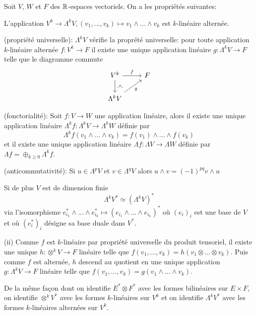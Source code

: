 \documentclass[12pt, a4paper]{book}
\begin{document}
\begin{pro}
Soit $V$, $W$ et $F$ des $\mathbb{R}$-espaces vectoriels. On a les propriétés suivantes:
\be
	\item L'application $V^k \to \Lambda^k V, (v_1, ..., v_k) \mapsto v_1 \wedge ... \wedge v_k$ est $k$-linéaire alternée.
	\item (propriété universelle): $\Lambda^k V$ vérifie la proprété universelle: pour toute application $k$-linéaire alternée $f: V^k \to F$ il existe une unique application linéaire $g : \Lambda^k V \to F$ telle que le diagramme commute
	$$\begin{tikzcd}
	V^k \arrow[r, "f"]  \arrow[d, ".\wedge ."] & F \\
	\Lambda^kV \arrow[ru, "g"']& 
	\end{tikzcd}$$
	\item (fonctorialité):  Soit $f: V \to W$ une application linéaire, alors il existe une unique application linéaire $\Lambda^k f : \Lambda^k V \to \Lambda^k W$ définie par
	$$\Lambda^k f (v_1\wedge ... \wedge v_k) = f(v_1) \wedge ... \wedge f(v_k)$$
	et il existe une unique application linéaire $\Lambda f : \Lambda V \to \Lambda W$ définie par $\Lambda f = \oplus_{k\geq 0} \Lambda^k f$. \\
	\item (anticommutativité): Si $u \in \Lambda^p V$ et $v \in \Lambda^q V$ alors $u\wedge v = (-1)^{pq} v\wedge u$
	\item Si de plus $V$ est de dimension finie
	$$\Lambda^k V^* \simeq (\Lambda^k V)^*$$ 
	via l'isomorphisme $e_{i_1}^* \wedge ...\wedge e_{i_k}^* \mapsto (e_{i_1} \wedge ... \wedge e_{i_k})^*$ où $(e_i)_i$ est une base de $V$ et où $(e_i^*)_i$ désigne sa base duale dans $V^*$.
\ee
\end{pro}
\begin{preu}
(ii) Comme $f$ est $k$-linéaire par propriété universelle du produit tensoriel, il existe une unique $h: \otimes^k V \to F$ linéaire telle que $f(v_1, ..., v_k) = h(v_1 \otimes ... \otimes v_k)$. Puis comme $f$ est alternée, $h$ descend au quotient en une unique application $g: \Lambda^k V \to F$ linéaire telle que $f(v_1, ..., v_k) = g(v_1\wedge ...\wedge v_k)$.   
\end{preu}

De la même façon dont on identifie $E^*\otimes F^*$ avec les formes bilinéaires sur $E\times F$, on identifie $\otimes^k V^*$ avec les formes $k$-linéaires sur $V^k$ et on identifie $\Lambda^k V^*$ avec les formes $k$-linéaires alternées sur $V^k$. \\
\end{document}
